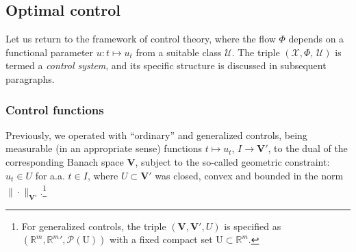 \documentclass[sn-mathphys-num]{sn-jnl}
\numberwithin{equation}{section}
\theoremstyle{mythm}
\theoremstyle{mydef}
\newcommand{\R}{\mathbb{R}}
\begin{document}
\subsection{Optimal control}

Let us return to the framework of control theory, where the flow \( \Phi \) depends on a functional parameter \( u \colon t \mapsto u_t \) from a suitable class \( \mathcal{U} \). The triple \((\mathcal{X}, \Phi, \, \mathcal{U}) \) is termed a \emph{control system}, and its specific structure is discussed in subsequent paragraphs. 

\subsubsection{Control functions}\label{ssec:controls}

Previously, we operated with ``ordinary'' and generalized controls, being measurable (in an appropriate sense) functions $t \mapsto u_t$, $I \to \bm V'$, to the dual of the corresponding Banach space $\bm V$, subject to the so-called geometric constraint: \(u_t \in U\) for a.a. $t \in I$, where $U  \subset\bm V'$ was closed, convex and bounded in the norm $\|\cdot\|_{\bm V'}$.\footnote{For generalized controls, the triple $(\bm V, \bm V', U)$ is specified as $(\R^m, {\R^m}', \mathcal P(\mathrm U))$ with a fixed compact set $\mathrm U \subset \R^m$.} 
\end{document}
